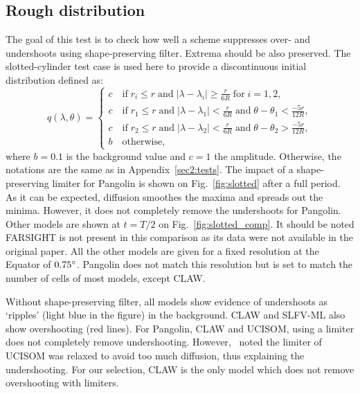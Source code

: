 \subsection{Rough distribution}
The goal of this test is to check how well a scheme suppresses over- and
undershoots using shape-preserving filter. Extrema should be also preserved.
The slotted-cylinder test case is used here to provide a discontinuous initial
distribution defined as:
\begin{equation*}
  q(\lambda, \theta) = 
  \begin{cases}
    c \quad \text{if} \; r_i \le r \; \text{and} \; 
    |\lambda-\lambda_i| \ge \frac{r}{6R} \; \text{for} \; i=1,2,\\
    c \quad \text{if} \; r_1 \le r \; \text{and} \; 
    |\lambda-\lambda_1| < \frac{r}{6R} \; \text{and} \; 
    \theta-\theta_1 < \frac{-5r}{12R},\\
    c \quad \text{if} \; r_2 \le r \; \text{and} \; 
    |\lambda-\lambda_2| < \frac{r}{6R} \; \text{and} \; 
    \theta-\theta_2 > \frac{-5r}{12R},\\
    b \quad \text{otherwise},
  \end{cases}
\end{equation*}
where $b=0.1$ is the background value and $c=1$ the amplitude. Otherwise, the
notations are the same as in Appendix~\ref{sec2:tests}. The impact of a
shape-preserving limiter for Pangolin is shown on Fig.~\ref{fig:slotted} after a
full period. As it can be expected, diffusion smoothes the maxima and
spreads out the minima. However, it does not completely remove the undershoots
for Pangolin.  Other models are shown at $t=T/2$ on Fig.~\ref{fig:slotted_comp}.
It should be noted FARSIGHT is not present in this comparison as its data were
not available in the original paper. All the other models are given for a fixed
resolution at the Equator of $0.75^{\circ}$. Pangolin does not match this
resolution but is set to match the number of cells of most models, except CLAW\@.

Without shape-preserving filter, all models show evidence of undershoots as
`ripples' (light blue in the figure) in the background. CLAW and SLFV-ML also
show overshooting (red lines). For Pangolin, CLAW and UCISOM, using a limiter
does not completely remove undershooting. However,~\cite{Lauritzen2014} noted
the limiter of UCISOM was relaxed to avoid too much diffusion, thus explaining
the undershooting.  For our selection, CLAW is the only model which does not
remove overshooting with limiters.

